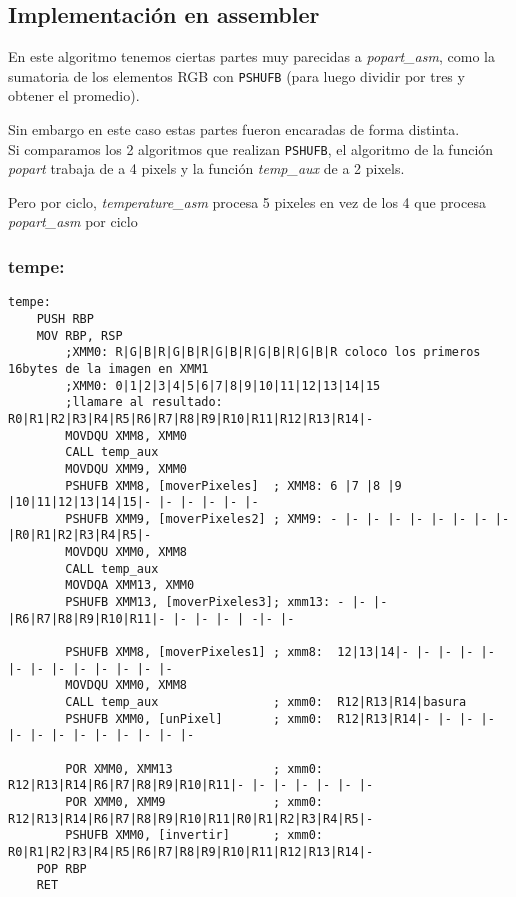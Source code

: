 \subsection{Implementaci\'on en assembler}

En este algoritmo tenemos ciertas partes muy parecidas a \textit{popart_asm}, como la sumatoria de los elementos RGB con \verb|PSHUFB| 
(para luego dividir por tres y obtener el promedio).

Sin embargo en este caso estas partes fueron encaradas de forma distinta. \\
Si comparamos los 2 algoritmos que realizan \verb|PSHUFB|, el algoritmo de la funci\'on \textit{popart} trabaja de a 4 pixels y la funci\'on 
\textit{temp_aux} de a 2 pixels.

Pero por ciclo, \textit{temperature_asm} procesa 5 pixeles en vez de los 4 que procesa \textit{popart_asm} por ciclo
\subsubsection{tempe:}
\begin{codesnippet}
\begin{verbatim}
tempe:
    PUSH RBP
    MOV RBP, RSP
        ;XMM0: R|G|B|R|G|B|R|G|B|R|G|B|R|G|B|R coloco los primeros 16bytes de la imagen en XMM1
        ;XMM0: 0|1|2|3|4|5|6|7|8|9|10|11|12|13|14|15
        ;llamare al resultado: R0|R1|R2|R3|R4|R5|R6|R7|R8|R9|R10|R11|R12|R13|R14|-
        MOVDQU XMM8, XMM0
        CALL temp_aux
        MOVDQU XMM9, XMM0
        PSHUFB XMM8, [moverPixeles]  ; XMM8: 6 |7 |8 |9 |10|11|12|13|14|15|- |- |- |- |- |-
        PSHUFB XMM9, [moverPixeles2] ; XMM9: - |- |- |- |- |- |- |- |- |R0|R1|R2|R3|R4|R5|-
        MOVDQU XMM0, XMM8	
        CALL temp_aux
        MOVDQA XMM13, XMM0
        PSHUFB XMM13, [moverPixeles3]; xmm13: - |- |- |R6|R7|R8|R9|R10|R11|- |- |- |- | -|- |-

        PSHUFB XMM8, [moverPixeles1] ; xmm8:  12|13|14|- |- |- |- |- |- |- |- |- |- |- |- |-
        MOVDQU XMM0, XMM8
        CALL temp_aux                ; xmm0:  R12|R13|R14|basura
        PSHUFB XMM0, [unPixel]       ; xmm0:  R12|R13|R14|- |- |- |- |- |- |- |- |- |- |- |- |-

        POR XMM0, XMM13              ; xmm0: R12|R13|R14|R6|R7|R8|R9|R10|R11|- |- |- |- |- |- |-
        POR XMM0, XMM9               ; xmm0: R12|R13|R14|R6|R7|R8|R9|R10|R11|R0|R1|R2|R3|R4|R5|-
        PSHUFB XMM0, [invertir]      ; xmm0: R0|R1|R2|R3|R4|R5|R6|R7|R8|R9|R10|R11|R12|R13|R14|-
    POP RBP
    RET
\end{verbatim}
\end{codesnippet}

